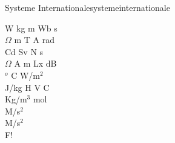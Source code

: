 \begin{song}{Systeme Internationale}{systemeinternationale}
\begin{vers}
W kg m Wb s\\
$\Omega$ m T A rad\\
Cd Sv N s\\
$\Omega$ A m Lx dB\\
$^o$ C W/m$^2$\\
J/kg H V C\\
Kg/m$^3$ mol\\
M/s$^2$\\
M/s$^2$\\
F!\\
\end{vers}
\end{song}

